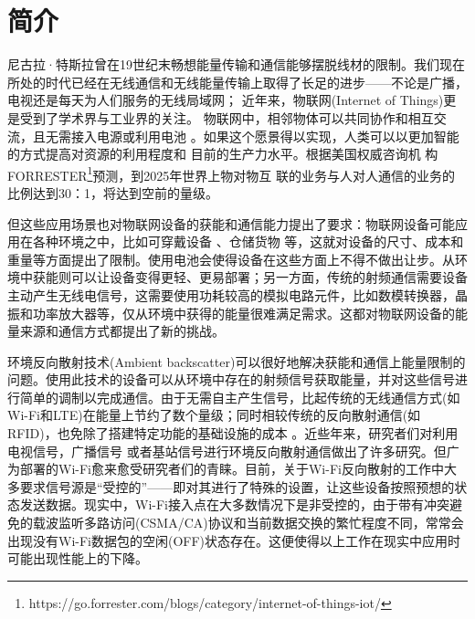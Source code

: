 
\chapter{简介}
\label{chap:introduction}

尼古拉·特斯拉曾在19世纪末畅想能量传输和通信能够摆脱线材的限制。我们现在所处的时代已经在无线通信和无线能量传输上取得了长足的进步——不论是广播，电视还是每天为人们服务的无线局域网；
近年来，物联网(Internet of Things)更是受到了学术界与工业界的关注。
物联网中，相邻物体可以共同协作和相互交流，且无需接入电源或利用电池\cite{gershenfeld2004internet}
。如果这个愿景得以实现，人类可以以更加智能的方式提高对资源的利用程度和
目前的生产力水平。根据美国权威咨询机
构FORRESTER\footnote{https://go.forrester.com/blogs/category/internet-of-things-iot/}预测，到2025年世界上物对物互
联的业务与人对人通信的业务的比例达到30：1，将达到空前的量级。

但这些应用场景也对物联网设备的获能和通信能力提出了要求：物联网设备可能应用在各种环境之中，比如可穿戴设备\cite{baker2017internet}
、仓储货物\cite{lee2018design}
等，这就对设备的尺寸、成本和重量等方面提出了限制。使用电池会使得设备在这些方面上不得不做出让步。从环境中获能则可以让设备变得更轻、更易部署；另一方面，传统的射频通信需要设备主动产生无线电信号，这需要使用功耗较高的模拟电路元件，比如数模转换器，晶振和功率放大器等，仅从环境中获得的能量很难满足需求。这都对物联网设备的能量来源和通信方式都提出了新的挑战。

环境反向散射技术(Ambient backscatter)可以很好地解决获能和通信上能量限制的问题。使用此技术的设备可以从环境中存在的射频信号获取能量，并对这些信号进行简单的调制以完成通信。由于无需自主产生信号，比起传统的无线通信方式(如Wi-Fi和LTE)在能量上节约了数个量级；同时相较传统的反向散射通信(如RFID)，也免除了搭建特定功能的基础设施的成本\cite{liu2013ambient}
。近些年来，研究者们对利用电视信号\cite{liu2013ambient}，广播信号\cite{wang2017fm}
或者基站信号\cite{parks2014sifting}进行环境反向散射通信做出了许多研究。但广为部署的Wi-Fi愈来愈受研究者们的青睐。目前，关于Wi-Fi反向散射的工作中大多要求信号源是“受控的”——即对其进行了特殊的设置，让这些设备按照预想的状态发送数据。现实中，Wi-Fi接入点在大多数情况下是非受控的，由于带有冲突避免的载波监听多路访问(CSMA/CA)协议和当前数据交换的繁忙程度不同，常常会出现没有Wi-Fi数据包的空闲(OFF)状态存在。这便使得以上工作在现实中应用时可能出现性能上的下降。

